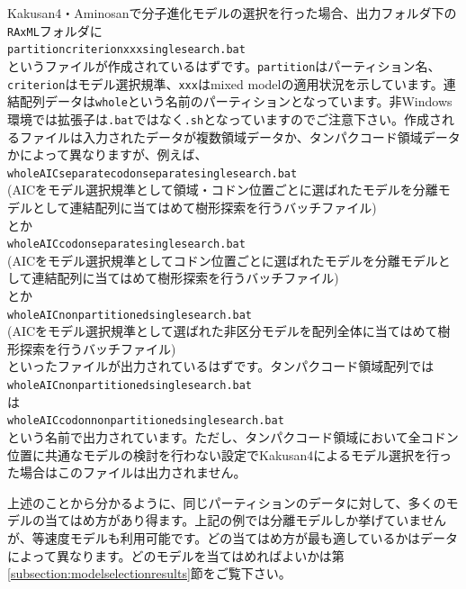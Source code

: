 \documentclass[titlepage,10pt,a4paper]{jsbook}
\begin{document}
Kakusan4・Aminosanで分子進化モデルの選択を行った場合、出力フォルダ下の\texttt{RAxML}フォルダに\\
\texttt{partition{\textunderscore}criterion{\textunderscore}xxx{\textunderscore}singlesearch.bat}\\
というファイルが作成されているはずです。\texttt{partition}はパーティション名、\texttt{criterion}はモデル選択規準、\texttt{xxx}はmixed modelの適用状況を示しています。連結配列データは\texttt{whole}という名前のパーティションとなっています。非Windows環境では拡張子は\texttt{.bat}ではなく\texttt{.sh}となっていますのでご注意下さい。作成されるファイルは入力されたデータが複数領域データか、タンパクコード領域データかによって異なりますが、例えば、\\
\texttt{whole{\textunderscore}AIC{\textunderscore}separate{\textunderscore}codonseparate{\textunderscore}singlesearch.bat}\\
(AICをモデル選択規準として領域・コドン位置ごとに選ばれたモデルを分離モデルとして連結配列に当てはめて樹形探索を行うバッチファイル)\\
とか\\
\texttt{whole{\textunderscore}AIC{\textunderscore}codonseparate{\textunderscore}singlesearch.bat}\\
(AICをモデル選択規準としてコドン位置ごとに選ばれたモデルを分離モデルとして連結配列に当てはめて樹形探索を行うバッチファイル)\\
とか\\
\texttt{whole{\textunderscore}AIC{\textunderscore}nonpartitioned{\textunderscore}singlesearch.bat}\\
(AICをモデル選択規準として選ばれた非区分モデルを配列全体に当てはめて樹形探索を行うバッチファイル)\\
といったファイルが出力されているはずです。タンパクコード領域配列では\\
\texttt{whole{\textunderscore}AIC{\textunderscore}nonpartitioned{\textunderscore}singlesearch.bat}\\
は\\
\texttt{whole{\textunderscore}AIC{\textunderscore}codonnonpartitioned{\textunderscore}singlesearch.bat}\\
という名前で出力されています。ただし、タンパクコード領域において全コドン位置に共通なモデルの検討を行わない設定でKakusan4によるモデル選択を行った場合はこのファイルは出力されません。

上述のことから分かるように、同じパーティションのデータに対して、多くのモデルの当てはめ方があり得ます。上記の例では分離モデルしか挙げていませんが、等速度モデルも利用可能です。どの当てはめ方が最も適しているかはデータによって異なります。どのモデルを当てはめればよいかは第\ref{subsection:modelselectionresults}節をご覧下さい。
\end{document}
